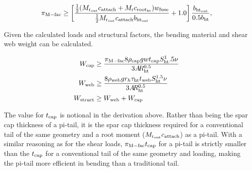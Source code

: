 \begin{equation}
    \pi_{\rm{M-fac}} \geq \left[\frac{\frac{1}{2}(M_{\rm{r}_{\rm{out}}} c_{\rm{attach}} +
    M_{\rm{r}} c_{\rm{root}_{\rm{ht}}}) w_{\textrm{fuse}}} {\frac{1}{2}M_{\rm{r}_{\rm{out}}} c_{\rm{attach}} 
b_{\rm{ht}_{\rm{out}}}} + 1.0\right]
    \frac{b_{\rm{ht}_{\rm{out}}}} {0.5b_{\rm{ht}}},
\end{equation}

Given the calculated loads and structural factors, the bending material and 
shear web weight can be calculated. 

\begin{align}
    W_{\rm{cap}} &\geq \frac{\pi_{\rm{M-fac}} 8 \rho_{\rm{cap}} g w t_{\rm{cap}} S_{\rm{ht}}^1.5 \nu}
    {3A\hspace{-2.0pt}R_{\rm{ht}}^{0.5}}\\
    W_{\rm{web}} &\geq \frac{8 \rho_{\rm{web}} g r_h \tau_{\rm{ht}} t_{\rm{web}} S_{\rm{ht}}^{1.5} 
\nu}{3A\hspace{-2.0pt}R_{\rm{ht}}^{0.5}}\\
    W_{\rm{struct}} &\geq W_{\rm{web}} + W_{\rm{cap}}
\end{align}

The value for $t_{\rm{cap}}$ is notional in the derivation above. Rather than being 
the spar cap thickness of a pi-tail, it is the spar cap thickness required for a 
conventional tail of the same geometry and a root moment  ($M_{\rm{r}_{\rm{out}}} 
c_{\rm{attach}}$) as a pi-tail. With a similar reasoning as for the shear loads, 
$\pi_{\rm{M-fac}} t_{\rm{cap}}$ for a pi-tail is strictly smaller than the $t_{\rm{cap}}$ for a 
conventional tail of the same geometry and loading, making the pi-tail more 
efficient in bending than a traditional tail. 